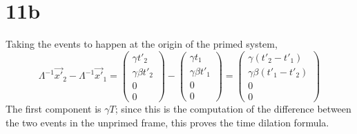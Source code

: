 \documentclass{article}
\begin{document}
\section*{11b}
Taking the events to happen at the origin of the primed system,
\[
  \Lambda^{-1} \vec{x'}_{2}-\Lambda^{-1} \vec{x'}_{1}
  =
  \begin{pmatrix}
    \gamma t'_{2} \\
    \gamma\beta t'_{2} \\
    0 \\
    0
  \end{pmatrix}
  -
  \begin{pmatrix}
    \gamma t_{1} \\
    \gamma\beta t'_{1} \\
    0 \\
    0
  \end{pmatrix}
  =
  \begin{pmatrix}
    \gamma(t'_{2}-t'_{1}) \\
    \gamma\beta(t'_{1}-t'_{2}) \\
    0 \\
    0
  \end{pmatrix}
\]
The first component is $\gamma T$; since this is the computation of the difference between the two events in the unprimed frame,
this proves the time dilation formula.
\end{document}
